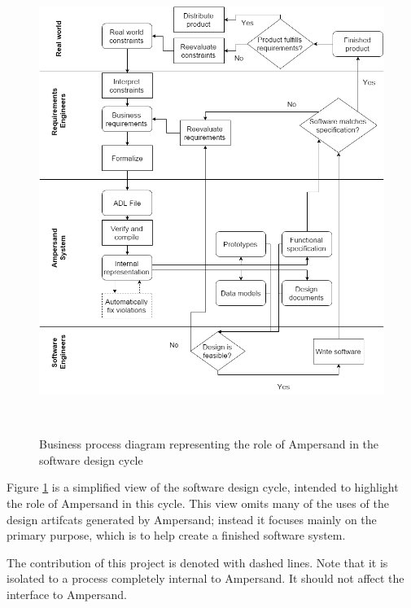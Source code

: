 \documentclass[12pt]{report}
\begin{document}
\begin{figure}[!htb]
\begin{center}
\includegraphics[width=\textwidth]{../figures/business_process}
\caption{Business process diagram representing the role of Ampersand in the
  software design cycle}~\label{fig:BusinessProcess}
\end{center}
\end{figure}

%

Figure \ref{fig:BusinessProcess} is a simplified view of the software design
cycle, intended to highlight the role of Ampersand in this cycle. This view
omits many of the uses of the design artifcats generated by Ampersand; instead
it focuses mainly on the primary purpose, which is to help create a finished
software system. 

The contribution of this project is denoted with dashed lines. Note that it is
isolated to a process completely internal to Ampersand. It should not affect the
interface to Ampersand.
\end{document}
